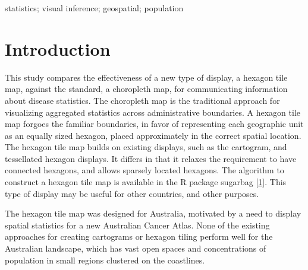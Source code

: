 \documentclass[conference,final,]{IEEEtran}
\begin{document}
\begin{IEEEkeywords}
statistics; visual inference; geospatial; population
\end{IEEEkeywords}




\maketitle


%
\IEEEpeerreviewmaketitle


\hypertarget{introduction}{%
\section{Introduction}\label{introduction}}

This study compares the effectiveness of a new type of display, a hexagon tile map, against the standard, a choropleth map, for communicating information about disease statistics. The choropleth map is the traditional approach for visualizing aggregated statistics across administrative boundaries. A hexagon tile map forgoes the familiar boundaries, in favor of representing each geographic unit as an equally sized hexagon, placed approximately in the correct spatial location. The hexagon tile map builds on existing displays, such as the cartogram, and tessellated hexagon displays. It differs in that it relaxes the requirement to have connected hexagons, and allows sparsely located hexagons. The algorithm to construct a hexagon tile map is available in the R package sugarbag {[}\protect\hyperlink{ref-sugarbag}{1}{]}. This type of display may be useful for other countries, and other purposes.

The hexagon tile map was designed for Australia, motivated by a need to display spatial statistics for a new Australian Cancer Atlas. None of the existing approaches for creating cartograms or hexagon tiling perform well for the Australian landscape, which has vast open spaces and concentrations of population in small regions clustered on the coastlines.
\end{document}
